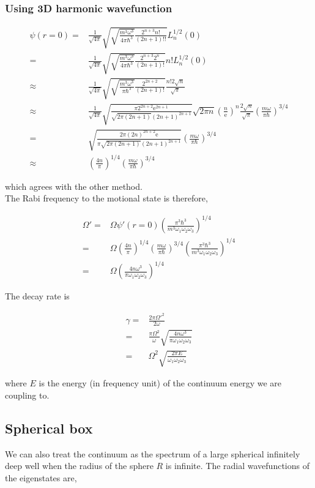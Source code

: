 \documentclass[10pt,fleqn]{article}
\newcommand{\ue}{\mathrm{e}}
\newcommand{\eqar}[1]
{
  \begin{align*}
    #1
  \end{align*}
}
\newcommand{\paren}[1]{{\left({#1}\right)}}
\begin{document}
\subsubsection{Using 3D harmonic wavefunction}
\eqar{
  \psi(r=0)=&\frac{1}{\sqrt{4\pi}}\sqrt{\sqrt{\frac{m^3\omega^3}{4\pi\hbar^3}}\frac{2^{n+3}n!}{(2n+1)!!}}L_n^{1/2}(0)\\
  =&\frac{1}{\sqrt{4\pi}}\sqrt{\sqrt{\frac{m^3\omega^3}{4\pi\hbar^3}}\frac{2^{n+3}2^n}{(2n+1)!}}n!L_n^{1/2}(0)\\
  \approx&\frac{1}{\sqrt{4\pi}}\sqrt{\sqrt{\frac{m^3\omega^3}{\pi\hbar^3}}\frac{2^{2n+2}}{(2n+1)!}}\frac{n! 2\sqrt{n}}{\sqrt{\pi}}\\
  \approx&\frac{1}{\sqrt{4\pi}}\sqrt{\frac{\pi 2^{2n+2}\ue^{2n+1}}{\sqrt{2\pi (2n+1)}(2n+1)^{2n+1}}}\sqrt{2\pi n}\paren{\frac{n}{\ue}}^n\frac{2\sqrt{n}}{\sqrt{\pi}}\paren{\frac{m\omega}{\pi\hbar}}^{3/4}\\
  =&\sqrt{\frac{2\pi (2n)^{2n+2}\ue}{\pi\sqrt{2\pi (2n+1)}(2n+1)^{2n+1}}}\paren{\frac{m\omega}{\pi\hbar}}^{3/4}\\
  \approx&\paren{\frac{4n}{\pi}}^{1/4}\paren{\frac{m\omega}{\pi\hbar}}^{3/4}
}
which agrees with the other method.\\

The Rabi frequency to the motional state is therefore,
\eqar{
  \Omega'=&\Omega\psi'(r=0)\paren{\frac{\pi^3\hbar^3}{m^3\omega_1\omega_2\omega_3}}^{1/4}\\
  =&\Omega\paren{\frac{4n}{\pi}}^{1/4}\paren{\frac{m\omega}{\pi\hbar}}^{3/4}\paren{\frac{\pi^3\hbar^3}{m^3\omega_1\omega_2\omega_3}}^{1/4}\\
  =&\Omega\paren{\frac{4n\omega^3}{\pi\omega_1\omega_2\omega_3}}^{1/4}
}
The decay rate is
\eqar{
  \gamma=&\frac{2\pi\Omega'^2}{2\omega}\\
  =&\frac{\pi\Omega^2}{\omega}\sqrt{\frac{4n\omega^3}{\pi\omega_1\omega_2\omega_3}}\\
  =&\Omega^2\sqrt{\frac{2\pi E}{\omega_1\omega_2\omega_3}}
}
where $E$ is the energy (in frequency unit) of the continuum energy we are coupling to.

\subsection{Spherical box}

We can also treat the continuum as the spectrum of a large spherical infinitely deep well
when the radius of the sphere $R$ is infinite.
The radial wavefunctions of the eigenstates are,
\end{document}
